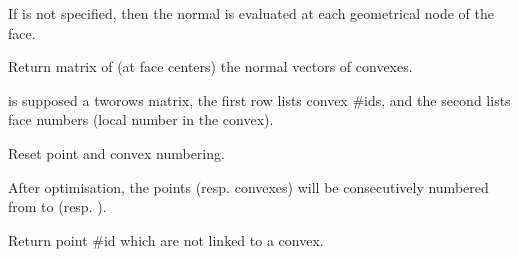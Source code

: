 \documentclass[a4paper,11pt,english]{sphinxmanual}
\begin{document}
\begin{fulllineitems}
\begin{fulllineitems}
If  is not specified, then the normal is evaluated at each
geometrical node of the face.

\end{fulllineitems}


\begin{fulllineitems}
\label{\detokenize{python/cmdref_Mesh:getfem.Mesh.normal_of_faces}}
Return matrix of (at face centers) the normal vectors of convexes.

 is supposed a two\sphinxhyphen{}rows matrix, the first row lists convex
\#ids, and the second lists face numbers (local number in the convex).

\end{fulllineitems}


\begin{fulllineitems}
\label{\detokenize{python/cmdref_Mesh:getfem.Mesh.optimize_structure}}
Reset point and convex numbering.

After optimisation, the points (resp. convexes) will
be consecutively numbered from  to
 (resp. ).

\end{fulllineitems}


\begin{fulllineitems}
\label{\detokenize{python/cmdref_Mesh:getfem.Mesh.orphaned_pid}}
Return point \#id which are not linked to a convex.

\end{fulllineitems}



\end{fulllineitems}
\end{document}
